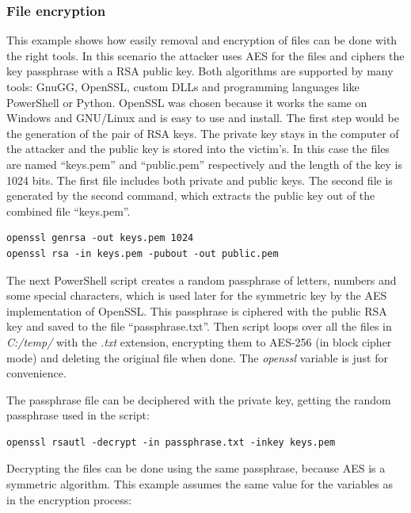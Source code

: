 \subsubsection{File encryption}
This example shows how easily removal and encryption of files can be done with the right tools.
\linej
In this scenario the attacker uses AES for the files and ciphers the key passphrase with a RSA public key.
Both algorithms are supported by many tools: GnuGG, OpenSSL, custom DLLs and programming languages like PowerShell or Python.
OpenSSL was chosen because it works the same on Windows and GNU/Linux and is easy to use and install.
\linej
\linej
The first step would be the generation of the pair of RSA keys.
The private key stays in the computer of the attacker and the public key is stored into the victim's.
In this case the files are named ``keys.pem'' and ``public.pem'' respectively and the length of the key is 1024 bits.
The first file includes both private and public keys.
The second file is generated by the second command, which extracts the public key out of the combined file ``keys.pem''.
\begin{lstlisting}[style=PS,keywordstyle=\color{black}]
openssl genrsa -out keys.pem 1024
openssl rsa -in keys.pem -pubout -out public.pem
\end{lstlisting}
\linej
The next PowerShell script creates a random passphrase of letters, numbers and some special characters, which is used later for the symmetric key by the AES implementation of OpenSSL.
This passphrase is ciphered with the public RSA key and saved to the file ``passphrase.txt''.
Then script loops over all the files in \textit{C:/temp/} with the \textit{.txt} extension, encrypting them to AES-256 (in block cipher mode) and deleting the original file when done.
The \textit{openssl} variable is just for convenience.

\linej
The passphrase file can be deciphered with the private key, getting the random passphrase used in the script:
\begin{lstlisting}[style=PS,keywordstyle=\color{black}]
openssl rsautl -decrypt -in passphrase.txt -inkey keys.pem
\end{lstlisting}
\linej
Decrypting the files can be done using the same passphrase, because AES is a symmetric algorithm.
This example assumes the same value for the variables as in the encryption process:

\linej

